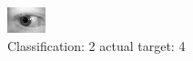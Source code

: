 \begin{figure}[h!]
\begin{center}
\includegraphics[width=0.60\columnwidth]{figures/ID857_class_2_target_4.png}
\end{center}
\caption{ Classification: 2 actual target: 4}
\label{fig:ID857_class_2_target_4}
\end{figure}
